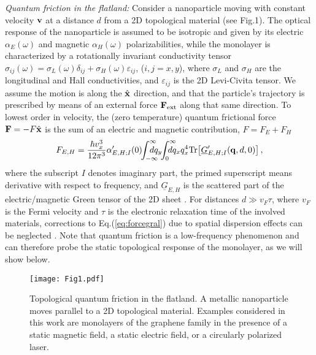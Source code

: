 \documentclass[10pt,aps,prl,superscriptaddress,showpacs,twocolumn]{revtex4-1}
\begin{document}

{\it Quantum friction in the flatland:}
Consider a nanoparticle moving with constant velocity ${\bf v}$ at a distance $d$ from a 2D topological material (see Fig.1). 
The optical response of the nanoparticle is assumed to be isotropic and given by its electric $\alpha_E(\omega)$ and magnetic $\alpha_H(\omega)$ polarizabilities, while the monolayer is characterized by a rotationally invariant conductivity tensor $\sigma_{ij}(\omega) = \sigma_L(\omega) \delta_{ij} +  \sigma_H(\omega) \varepsilon_{ij}$, ($i,j=x,y$), where $\sigma_L$ and $\sigma_H$ are the longitudinal and Hall conductivities, and $\varepsilon_{ij}$ is the 2D Levi-Civita tensor. We assume the motion is along the $\hat{\bf x}$ direction,
and that the particle's trajectory is prescribed by means of an external force ${\bf F}_{\rm ext}$ along that same direction.
To lowest order in velocity, the (zero temperature) quantum frictional force $\textbf{F}= - F \hat{\bf x}$ is the sum of an electric and magnetic contribution, $F= F_{E} + F_{H}$ \cite{Intravaia2014,Volokitin2008}
\begin{equation}
\label{eq:forcegral}
F_{E,H} = \frac{\hbar v_x^3}{12 \pi^3} {\alpha}^{\prime}_{E,H;I}(0) \!\! 
\int_{-\infty}^{\infty} \! \!  \! \! \!\!\! dq_y \!\! \int_0^{\infty} \! \! \! \! \!\!\! dq_x q_x^4 
{\rm Tr} \! \left[\underline{G}_{E,H;I}^{\prime}({\bf q},d,0) \right] ,
\end{equation}
where the subscript $I$ denotes imaginary part, the primed superscript means derivative with respect to frequency, and $\underline{G}_{E,H}$ is the scattered part of the electric/magnetic Green tensor of the 2D sheet \cite{Green}. 
For distances $d\gg v_F \tau$, where $v_F$ is the Fermi velocity and $\tau$ is the electronic relaxation time of the involved materials, corrections to Eq.(\ref{eq:forcegral}) due to spatial dispersion effects can be neglected \cite{Reiche2017}.
Note that quantum friction is a low-frequency phenomenon and can therefore probe the static topological response of the monolayer, as we will show below.

\begin{figure}%
\centering
\texttt{[image: Fig1.pdf]}
\caption{Topological quantum friction in the flatland. A metallic nanoparticle moves parallel to a 2D topological material. Examples considered in this work are monolayers of the graphene family in the presence of a static magnetic field, a static electric field, or a circularly polarized laser. 
} 
\label{Fig1}
\end{figure}
\end{document}
